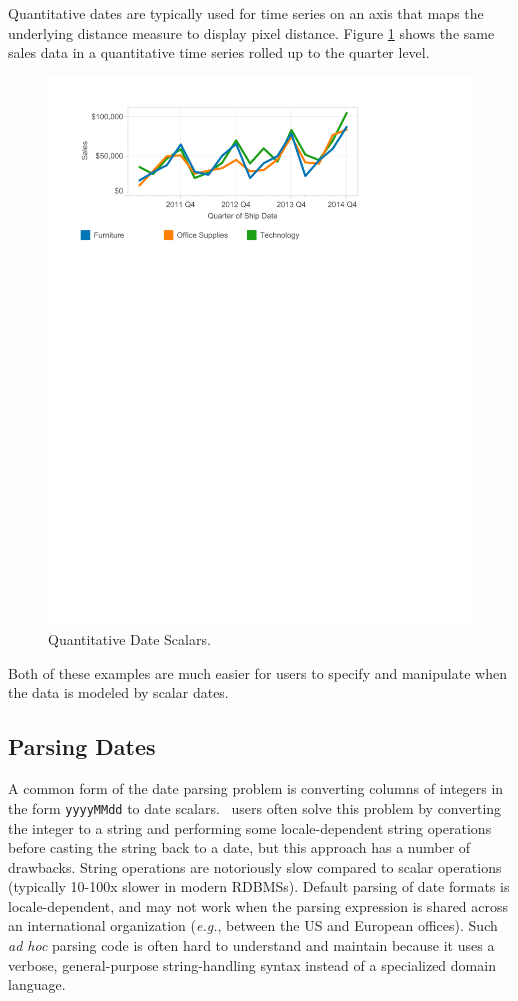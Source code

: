 Quantitative dates are typically used for time series on an axis that maps the underlying distance measure to display pixel distance. 
Figure \ref{fig:I2} shows the same sales data in a quantitative time series rolled up to the quarter level.

\begin{figure}[ht]
\centering
\includegraphics[width=\columnwidth]{figures/FigureI2}
\caption{Quantitative Date Scalars.}
\label{fig:I2}
\end{figure}

Both of these examples are much easier for users to specify and manipulate when the data is modeled by scalar dates.


\subsection{Parsing Dates}
A common form of the date parsing problem is converting columns of integers in the form \texttt{yyyyMMdd} to date scalars. \Naive\ users often solve this problem by converting the integer to a string and performing some locale-dependent string operations before casting the string back to a date, but this approach has a number of drawbacks. String operations are notoriously slow compared to scalar operations (typically 10-100x slower in modern RDBMSs). Default parsing of date formats is locale-dependent, and may not work when the parsing expression is shared across an international organization (\textit{e.g.}, between the US and European offices). Such \textit{ad hoc} parsing code is often hard to understand and maintain because it uses a verbose, general-purpose string-handling syntax instead of a specialized domain language.

